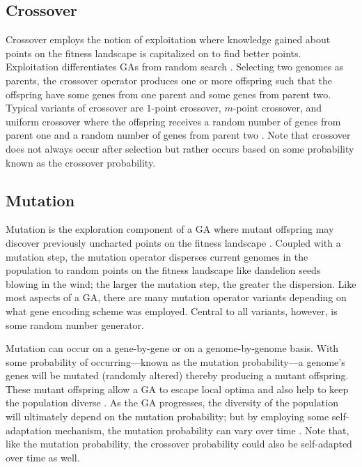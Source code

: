 \subsection{Crossover}

Crossover employs the notion of exploitation where knowledge gained about points on the fitness landscape is capitalized on to find better points. Exploitation differentiates GAs from random search \cite{Beasley93anoverview}. Selecting two genomes as parents, the crossover operator produces one or more offspring such that the offspring have some genes from one parent and some genes from parent two. Typical variants of crossover are $1$-point crossover, $m$-point crossover, and uniform crossover where the offspring receives a random number of genes from parent one and a random number of genes from parent two \cite{ColinReeves}. Note that crossover does not always occur after selection but rather occurs based on some probability known as the crossover probability.    

\subsection{Mutation}

Mutation is the exploration component of a GA where mutant offspring may discover previously uncharted points on the fitness landscape \cite{Beasley93anoverview}. Coupled with a mutation step, the mutation operator disperses current genomes in the population to random points on the fitness landscape like dandelion seeds blowing in the wind; the larger the mutation step, the greater the dispersion. Like most aspects of a GA, there are many mutation operator variants depending on what gene encoding scheme was employed. Central to all variants, however, is some random number generator. 

Mutation can occur on a gene-by-gene or on a genome-by-genome basis. With some probability of occurring---known as the mutation probability---a genome's genes will be mutated (randomly altered) thereby producing a mutant offspring. These mutant offspring allow a GA to escape local optima and also help to keep the population diverse \cite{ColinReeves}. As the GA progresses, the diversity of the population will ultimately depend on the mutation probability; but by employing some self-adaptation mechanism, the mutation probability can vary over time \cite{ColinReeves}. Note that, like the mutation probability, the crossover probability could also be self-adapted over time as well.       

